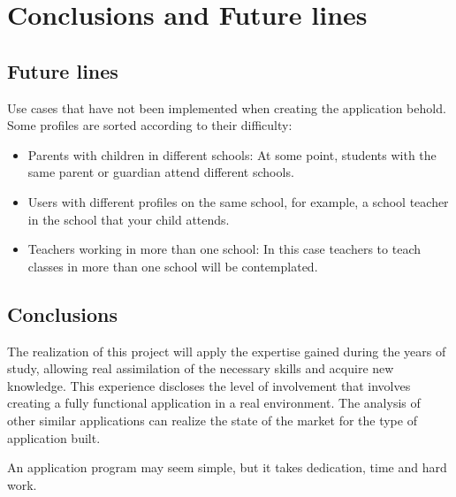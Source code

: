 %
%
%
%

\cleardoublepage
\chapter{Conclusions and Future lines}
\label{chap:futureLines}

	\section{Future lines}
	
		Use cases that have not been implemented when creating the application behold. Some profiles are sorted according to their difficulty:
		
		\begin{itemize}
			\item Parents with children in different schools: At some point, students with the same parent or guardian attend different schools.
			\item Users with different profiles on the same school, for example, a school teacher in the school that your child attends.
			\item Teachers working in more than one school: In this case teachers to teach classes in more than one school will be contemplated.
		\end{itemize}
	
	\section{Conclusions}
		The realization of this project will apply the expertise gained during the years of study, allowing real assimilation of the necessary skills and acquire new knowledge.
		This experience discloses the level of involvement that involves creating a fully functional application in a real environment. The analysis of other similar applications can realize the state of the market for the type of application built.
		
		\bigskip
		An application program may seem simple, but it takes dedication, time and hard work.